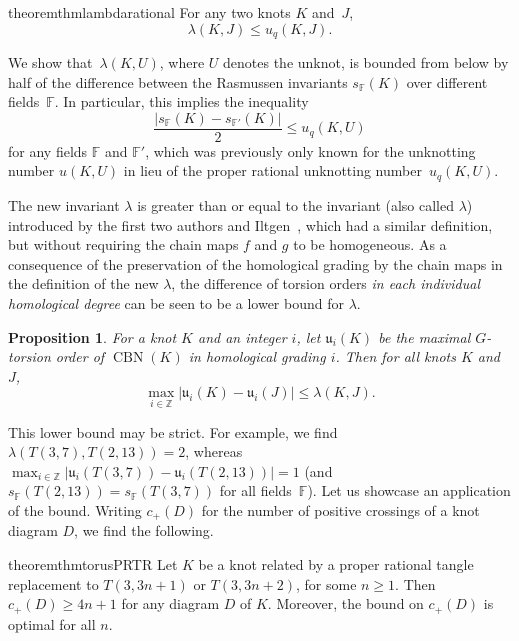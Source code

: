 \documentclass[11pt,a4paper,twoside]{amsart}
\newtheorem{proposition}[theorem]{Proposition}
\theoremstyle{definition}
\def\lambda{λ}%
\newcommand{\BNr}{{\operatorname{CBN}}}%
\begin{document}
\begin{restatable}{theorem}{thmlambdarational}\label{thm:lambda_proper_rational_gordian}
    For any two knots \(K\) and~\(J\),
    \[
    \lambda(K,J) \leq u_q(K,J).
    \]
\end{restatable}

We show that~$\lambda(K,U)$, where $U$ denotes the unknot, is bounded from below by half of the difference between the Rasmussen invariants $s_{\mathbb{F}}(K)$ over different fields~$\mathbb{F}$.
In particular, this implies the inequality
\[
\frac{|s_{\mathbb{F}}(K) - s_{\mathbb{F}'}(K)|}2 \leq u_q(K,U)
\]
for any fields \(\mathbb{F}\) and \(\mathbb{F}'\),
which was previously only known for the unknotting number $u(K,U)$ in lieu of the proper rational unknotting number~$u_q(K,U)$.

The new invariant $\lambda$ is greater than or equal to the invariant (also called $\lambda$) introduced by the first two authors and Iltgen~\cite{lambda1}, which had a similar definition, but without requiring the chain maps $f$ and $g$ to be homogeneous.
As a consequence of the preservation of the homological grading by the chain maps in the definition of the new $\lambda$, the difference of torsion orders \emph{in each individual homological degree} can be seen to be a lower bound for $\lambda$.

\begin{proposition}\label{prop:localtorsion}
For a knot \(K\) and an integer \(i\), let \(\mathfrak{u}_i(K)\) be the maximal \(G\)-torsion order
of \(\BNr(K)\) in homological grading \(i\). Then for all knots \(K\) and \(J\), 
\[
\max_{i\in\mathbb{Z}} |\mathfrak{u}_i(K) - \mathfrak{u}_i(J)| \leq \lambda(K,J).
\]
\end{proposition}
This lower bound may be strict.
For example, we find $\lambda(T (3, 7), T (2, 13)) = 2$,
whereas $\max_{i\in\mathbb{Z}} |\mathfrak{u}_i(T (3, 7)) - \mathfrak{u}_i(T (2, 13))| = 1$
(and $s_{\mathbb{F}}(T (2, 13)) = s_{\mathbb{F}}(T (3, 7))$ for all fields~$\mathbb{F}$).
Let us showcase an application of the bound.
Writing $c_+(D)$ for the number of positive crossings of a knot diagram $D$, we find the following.
\begin{restatable}{theorem}{thmtorusPRTR}\label{thm:torus_PRTR}
    Let \(K\) be a knot related by a proper rational tangle replacement to \(T(3,3n+1)\) or \(T(3,3n+2)\), for some \(n\geq 1\). 
    Then \(c_+(D)\geq 4n+1\) for any diagram \(D\) of \(K\).
    Moreover, the bound on $c_+(D)$ is optimal for all $n$.
\end{restatable}
\end{document}

